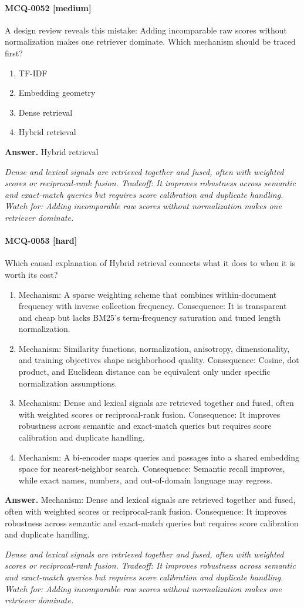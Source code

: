 \paragraph{MCQ-0052 [medium]} A design review reveals this mistake: Adding incomparable raw scores without normalization makes one retriever dominate. Which mechanism should be traced first?
\begin{enumerate}[label=\Alph*.]
\item TF-IDF
\item Embedding geometry
\item Dense retrieval
\item Hybrid retrieval
\end{enumerate}
\noindent\textbf{Answer.} Hybrid retrieval
\par\textit{Dense and lexical signals are retrieved together and fused, often with weighted scores or reciprocal-rank fusion. Tradeoff: It improves robustness across semantic and exact-match queries but requires score calibration and duplicate handling. Watch for: Adding incomparable raw scores without normalization makes one retriever dominate.}
\paragraph{MCQ-0053 [hard]} Which causal explanation of Hybrid retrieval connects what it does to when it is worth its cost?
\begin{enumerate}[label=\Alph*.]
\item Mechanism: A sparse weighting scheme that combines within-document frequency with inverse collection frequency. Consequence: It is transparent and cheap but lacks BM25's term-frequency saturation and tuned length normalization.
\item Mechanism: Similarity functions, normalization, anisotropy, dimensionality, and training objectives shape neighborhood quality. Consequence: Cosine, dot product, and Euclidean distance can be equivalent only under specific normalization assumptions.
\item Mechanism: Dense and lexical signals are retrieved together and fused, often with weighted scores or reciprocal-rank fusion. Consequence: It improves robustness across semantic and exact-match queries but requires score calibration and duplicate handling.
\item Mechanism: A bi-encoder maps queries and passages into a shared embedding space for nearest-neighbor search. Consequence: Semantic recall improves, while exact names, numbers, and out-of-domain language may regress.
\end{enumerate}
\noindent\textbf{Answer.} Mechanism: Dense and lexical signals are retrieved together and fused, often with weighted scores or reciprocal-rank fusion. Consequence: It improves robustness across semantic and exact-match queries but requires score calibration and duplicate handling.
\par\textit{Dense and lexical signals are retrieved together and fused, often with weighted scores or reciprocal-rank fusion. Tradeoff: It improves robustness across semantic and exact-match queries but requires score calibration and duplicate handling. Watch for: Adding incomparable raw scores without normalization makes one retriever dominate.}

